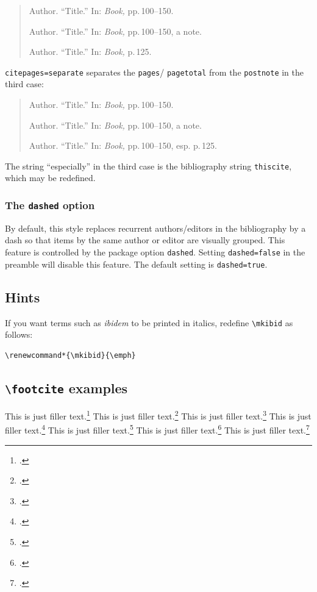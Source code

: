 \documentclass[a4paper]{article}
\newcommand{\cmd}[1]{\texttt{\textbackslash #1}}
\begin{document}
\begin{quote}
Author. \enquote{Title.} In: \emph{Book,} pp.\,100--150.

Author. \enquote{Title.} In: \emph{Book,} pp.\,100--150, a note.

Author. \enquote{Title.} In: \emph{Book,} p.\,125.
\end{quote}
%
\texttt{citepages=separate} separates the \texttt{pages}\slash
\texttt{pagetotal} from the \texttt{postnote} in the third case:

\begin{quote}
Author. \enquote{Title.} In: \emph{Book,} pp.\,100--150.

Author. \enquote{Title.} In: \emph{Book,} pp.\,100--150, a note.

Author. \enquote{Title.} In: \emph{Book,} pp.\,100--150, esp. p.\,125.
\end{quote}
%
The string \enquote{especially} in the third case is the bibliography
string \texttt{thiscite}, which may be redefined.

\subsubsection*{The \texttt{dashed} option}

By default, this style replaces recurrent authors/editors in the
bibliography by a dash so that items by the same author or editor
are visually grouped. This feature is controlled by the package
option \texttt{dashed}. Setting \texttt{dashed=false} in the
preamble will disable this feature. The default setting is
\texttt{dashed=true}.

\subsection*{Hints}

If you want terms such as \emph{ibidem} to be printed in italics,
redefine \cmd{mkibid} as follows:

\begin{verbatim}
\renewcommand*{\mkibid}{\emph}
\end{verbatim}

\clearpage

\subsection*{\cmd{footcite} examples}

This is just filler text.\footcite{aristotle:anima}
This is just filler text.\footcite{aristotle:physics}
This is just filler text.\footcite{aristotle:anima}
This is just filler text.\footcite{aristotle:physics}
This is just filler text.\footcite{aristotle:physics}
\clearpage
This is just filler text.\footcite{aristotle:physics}
This is just filler text.\footcite{aristotle:physics}
\end{document}
